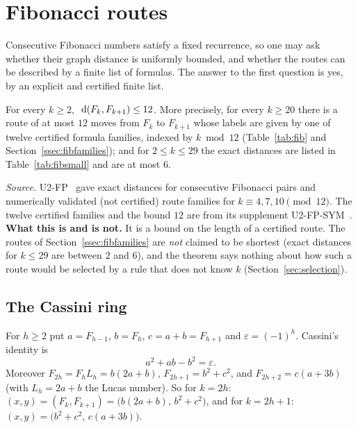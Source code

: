 \section{Fibonacci routes}\label{sec:fibonacci}
Consecutive Fibonacci numbers satisfy a fixed recurrence, so one may ask whether their graph distance is uniformly bounded, and whether the routes can be described by a finite list of formulas. The answer to the first question is yes, by an explicit and certified finite list.
\begin{theorem}\label{thm:fibonacci}
For every $k\ge2$, $\ \operatorname{d}(F_k,F_{k+1})\le12$. More precisely, for every $k\ge20$ there is a route of at most $12$ moves from $F_k$ to $F_{k+1}$ whose labels are given by one of twelve certified formula families, indexed by $k\bmod12$ (Table~\ref{tab:fib} and Section~\ref{ssec:fibfamilies}); and for $2\le k\le29$ the exact distances are listed in Table~\ref{tab:fibsmall} and are at most $6$.
\end{theorem}
\noindent\emph{Source.} U2-FP~\cite{u2fp} gave exact distances for consecutive Fibonacci pairs and numerically validated (not certified) route families for $k\equiv4,7,10\pmod{12}$. The twelve certified families and the bound $12$ are from its supplement U2-FP-SYM~\cite{u2fpsym}.
\textbf{What this is and is not.} It is a bound on the length of a certified route. The routes of Section~\ref{ssec:fibfamilies} are \emph{not} claimed to be shortest (exact distances for $k\le29$ are between $2$ and $6$), and the theorem says nothing about how such a route would be selected by a rule that does not know $k$ (Section~\ref{sec:selection}).

\subsection{The Cassini ring}
For $h\ge2$ put $a=F_{h-1}$, $b=F_h$, $c=a+b=F_{h+1}$ and $\varepsilon=(-1)^h$. Cassini's identity is
\begin{equation}\label{eq:cassini}
a^2+ab-b^2=\varepsilon.
\end{equation}
Moreover $F_{2h}=F_hL_h=b(2a+b)$, $F_{2h+1}=b^2+c^2$, and $F_{2h+2}=c(a+3b)$ (with $L_h=2a+b$ the Lucas number). So for $k=2h$: $(x,y)=(F_k,F_{k+1})=\bigl(b(2a+b),\,b^2+c^2\bigr)$, and for $k=2h+1$: $(x,y)=\bigl(b^2+c^2,\,c(a+3b)\bigr)$.

